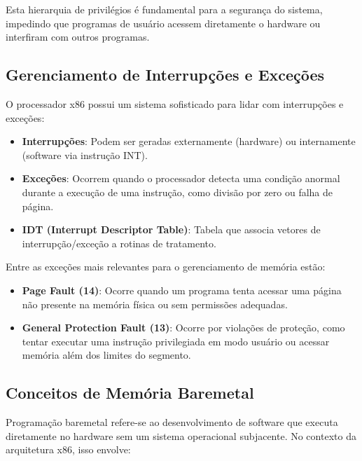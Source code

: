 Esta hierarquia de privilégios é fundamental para a segurança do sistema, impedindo que programas de usuário acessem diretamente o hardware ou interfiram com outros programas.

\subsection{Gerenciamento de Interrupções e Exceções}
\label{subsec:interrupcoes}

O processador x86 possui um sistema sofisticado para lidar com interrupções e exceções:

\begin{itemize}
    \item \textbf{Interrupções}: Podem ser geradas externamente (hardware) ou internamente (software via instrução INT).

    \item \textbf{Exceções}: Ocorrem quando o processador detecta uma condição anormal durante a execução de uma instrução, como divisão por zero ou falha de página.

    \item \textbf{IDT (Interrupt Descriptor Table)}: Tabela que associa vetores de interrupção/exceção a rotinas de tratamento.
\end{itemize}

Entre as exceções mais relevantes para o gerenciamento de memória estão:
\begin{itemize}
    \item \textbf{Page Fault (14)}: Ocorre quando um programa tenta acessar uma página não presente na memória física ou sem permissões adequadas.

    \item \textbf{General Protection Fault (13)}: Ocorre por violações de proteção, como tentar executar uma instrução privilegiada em modo usuário ou acessar memória além dos limites do segmento.
\end{itemize}

\subsection{Conceitos de Memória Baremetal}
\label{subsec:baremetal}

Programação baremetal refere-se ao desenvolvimento de software que executa diretamente no hardware sem um sistema operacional subjacente. No contexto da arquitetura x86, isso envolve:

